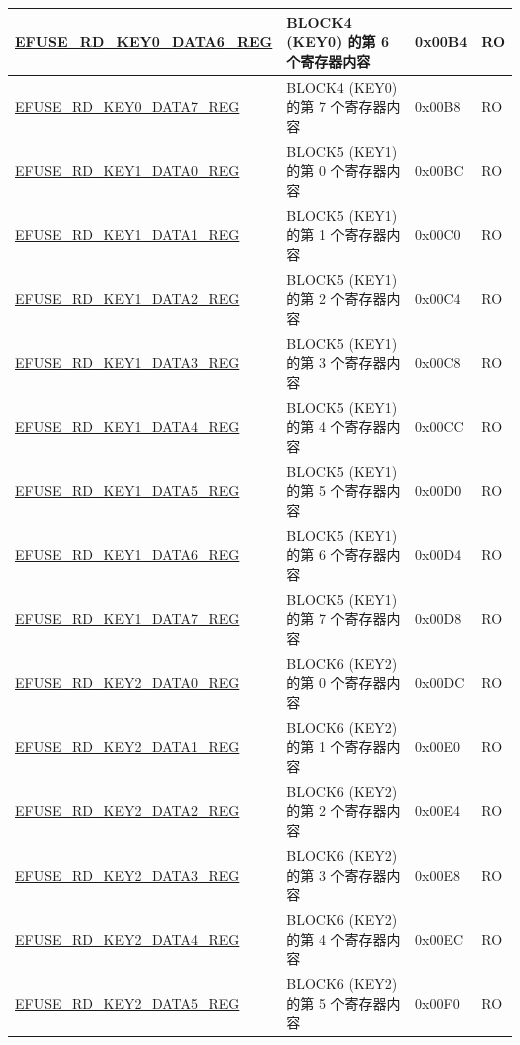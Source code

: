 \begin{longtable}{ | p{6cm} | p{7.2cm} | p{1.3cm} | p{1cm} | }
\hyperref[regdesc:EFUSERDKEY0DATA6REG]{EFUSE\_RD\_KEY0\_DATA6\_REG} & BLOCK4 (KEY0) 的第 6 个寄存器内容  & 0x00B4 & RO \\ \hline
\hyperref[regdesc:EFUSERDKEY0DATA7REG]{EFUSE\_RD\_KEY0\_DATA7\_REG} & BLOCK4 (KEY0) 的第 7 个寄存器内容  & 0x00B8 & RO \\ \hline
\hyperref[regdesc:EFUSERDKEY1DATA0REG]{EFUSE\_RD\_KEY1\_DATA0\_REG} & BLOCK5 (KEY1) 的第 0 个寄存器内容  & 0x00BC & RO \\ \hline
\hyperref[regdesc:EFUSERDKEY1DATA1REG]{EFUSE\_RD\_KEY1\_DATA1\_REG} & BLOCK5 (KEY1) 的第 1 个寄存器内容  & 0x00C0 & RO \\ \hline
\hyperref[regdesc:EFUSERDKEY1DATA2REG]{EFUSE\_RD\_KEY1\_DATA2\_REG} & BLOCK5 (KEY1) 的第 2 个寄存器内容  & 0x00C4 & RO \\ \hline
\hyperref[regdesc:EFUSERDKEY1DATA3REG]{EFUSE\_RD\_KEY1\_DATA3\_REG} & BLOCK5 (KEY1) 的第 3 个寄存器内容  & 0x00C8 & RO \\ \hline
\hyperref[regdesc:EFUSERDKEY1DATA4REG]{EFUSE\_RD\_KEY1\_DATA4\_REG} & BLOCK5 (KEY1) 的第 4 个寄存器内容  & 0x00CC & RO \\ \hline
\hyperref[regdesc:EFUSERDKEY1DATA5REG]{EFUSE\_RD\_KEY1\_DATA5\_REG} & BLOCK5 (KEY1) 的第 5 个寄存器内容  & 0x00D0 & RO \\ \hline
\hyperref[regdesc:EFUSERDKEY1DATA6REG]{EFUSE\_RD\_KEY1\_DATA6\_REG} & BLOCK5 (KEY1) 的第 6 个寄存器内容  & 0x00D4 & RO \\ \hline
\hyperref[regdesc:EFUSERDKEY1DATA7REG]{EFUSE\_RD\_KEY1\_DATA7\_REG} & BLOCK5 (KEY1) 的第 7 个寄存器内容  & 0x00D8 & RO \\ \hline
\hyperref[regdesc:EFUSERDKEY2DATA0REG]{EFUSE\_RD\_KEY2\_DATA0\_REG} & BLOCK6 (KEY2) 的第 0 个寄存器内容  & 0x00DC & RO \\ \hline
\hyperref[regdesc:EFUSERDKEY2DATA1REG]{EFUSE\_RD\_KEY2\_DATA1\_REG} & BLOCK6 (KEY2) 的第 1 个寄存器内容  & 0x00E0 & RO \\ \hline
\hyperref[regdesc:EFUSERDKEY2DATA2REG]{EFUSE\_RD\_KEY2\_DATA2\_REG} & BLOCK6 (KEY2) 的第 2 个寄存器内容  & 0x00E4 & RO \\ \hline
\hyperref[regdesc:EFUSERDKEY2DATA3REG]{EFUSE\_RD\_KEY2\_DATA3\_REG} & BLOCK6 (KEY2) 的第 3 个寄存器内容  & 0x00E8 & RO \\ \hline
\hyperref[regdesc:EFUSERDKEY2DATA4REG]{EFUSE\_RD\_KEY2\_DATA4\_REG} & BLOCK6 (KEY2) 的第 4 个寄存器内容  & 0x00EC & RO \\ \hline
\hyperref[regdesc:EFUSERDKEY2DATA5REG]{EFUSE\_RD\_KEY2\_DATA5\_REG} & BLOCK6 (KEY2) 的第 5 个寄存器内容  & 0x00F0 & RO \\ \hline

\end{longtable}

